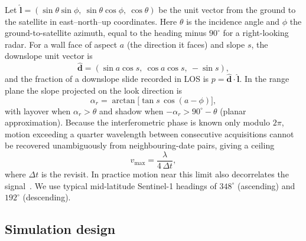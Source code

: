 \documentclass[aps,prd,twocolumn,superscriptaddress,nofootinbib,floatfix,preprintnumbers,10pt]{revtex4-2}
\newcommand{\vhat}[1]{\hat{\bm{#1}}}
\begin{document}
Let $\vhat{l}=(\sin\theta\sin\phi,\ \sin\theta\cos\phi,\ \cos\theta)$ be the unit vector from the ground to the satellite in east--north--up coordinates. Here $\theta$ is the incidence angle and $\phi$ the ground-to-satellite azimuth, equal to the heading minus $90^\circ$ for a right-looking radar. For a wall face of aspect $a$ (the direction it faces) and slope $s$, the downslope unit vector is
\begin{equation}
\vhat{d} = (\sin a\cos s,\ \cos a\cos s,\ -\sin s),
\label{eq:dhat}
\end{equation}
and the fraction of a downslope slide recorded in LOS is $p=\vhat{d}\cdot\vhat{l}$. In the range plane the slope projected on the look direction is
\begin{equation}
\alpha_r = \arctan\!\big[\tan s\,\cos(a-\phi)\big],
\label{eq:alphar}
\end{equation}
with layover when $\alpha_r>\theta$ and shadow when $-\alpha_r>90^\circ-\theta$ (planar approximation). Because the interferometric phase is known only modulo $2\pi$, motion exceeding a quarter wavelength between consecutive acquisitions cannot be recovered unambiguously from neighbouring-date pairs, giving a ceiling
\begin{equation}
v_{\max} = \frac{\lambda}{4\,\Delta t},
\label{eq:alias}
\end{equation}
where $\Delta t$ is the revisit. In practice motion near this limit also decorrelates the signal~\cite{Zebker1992}. We use typical mid-latitude Sentinel-1 headings of $348^\circ$ (ascending) and $192^\circ$ (descending).

\subsection{Simulation design}\label{sec:simdesign}
\end{document}
